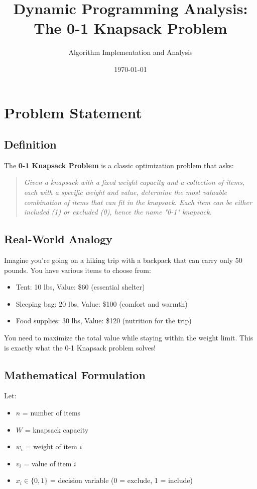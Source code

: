 \documentclass[12pt,a4paper]{article}
\title{\textbf{Dynamic Programming Analysis: \\The 0-1 Knapsack Problem}}
\author{Algorithm Implementation and Analysis}
\date{\today}
\begin{document}
\maketitle

\tableofcontents
\newpage

\section{Problem Statement}

\subsection{Definition}
The \textbf{0-1 Knapsack Problem} is a classic optimization problem that asks:

\begin{quote}
\textit{Given a knapsack with a fixed weight capacity and a collection of items, each with a specific weight and value, determine the most valuable combination of items that can fit in the knapsack. Each item can be either included (1) or excluded (0), hence the name "0-1" knapsack.}
\end{quote}

\subsection{Real-World Analogy}
Imagine you're going on a hiking trip with a backpack that can carry only 50 pounds. You have various items to choose from:
\begin{itemize}
\item Tent: 10 lbs, Value: \$60 (essential shelter)
\item Sleeping bag: 20 lbs, Value: \$100 (comfort and warmth)
\item Food supplies: 30 lbs, Value: \$120 (nutrition for the trip)
\end{itemize}

You need to maximize the total value while staying within the weight limit. This is exactly what the 0-1 Knapsack problem solves!

\subsection{Mathematical Formulation}
Let:
\begin{itemize}
\item $n$ = number of items
\item $W$ = knapsack capacity
\item $w_i$ = weight of item $i$
\item $v_i$ = value of item $i$
\item $x_i \in \{0, 1\}$ = decision variable (0 = exclude, 1 = include)
\end{itemize}
\end{document}

